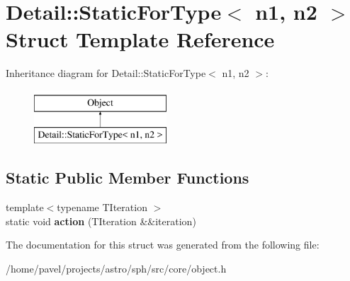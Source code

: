 \hypertarget{structDetail_1_1StaticForType}{}\section{Detail\+:\+:Static\+For\+Type$<$ n1, n2 $>$ Struct Template Reference}
\label{structDetail_1_1StaticForType}
Inheritance diagram for Detail\+:\+:Static\+For\+Type$<$ n1, n2 $>$\+:\begin{figure}[H]
\begin{center}
\leavevmode
\includegraphics[height=2.000000cm]{structDetail_1_1StaticForType}
\end{center}
\end{figure}
\subsection*{Static Public Member Functions}
\begin{DoxyCompactItemize}
\item 
\hypertarget{structDetail_1_1StaticForType_acea547637ee07eb9266ab497b13281fd}{}\label{structDetail_1_1StaticForType_acea547637ee07eb9266ab497b13281fd} 
{\footnotesize template$<$typename T\+Iteration $>$ }\\static void {\bfseries action} (T\+Iteration \&\&iteration)
\end{DoxyCompactItemize}


The documentation for this struct was generated from the following file\+:\begin{DoxyCompactItemize}
\item 
/home/pavel/projects/astro/sph/src/core/object.\+h\end{DoxyCompactItemize}
